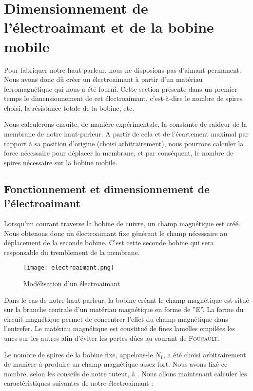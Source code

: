

\section{Dimensionnement de l'électroaimant et de la bobine mobile}
Pour fabriquer notre haut-parleur, nous ne disposions pas d'aimant permanent. Nous avons donc
dû créer un électroaimant à partir d'un matériau ferromagnétique qui nous a été fourni.
Cette section présente dans un premier temps le dimensionnement de cet électroaimant, c'est-à-dire le
nombre de spires choisi, la résistance totale de la bobine, etc.

Nous calculerons ensuite, de manière expérimentale, la constante de raideur de la membrane de
notre haut-parleur. A partir de cela et de l'écartement maximal par rapport à sa position d'origine 
(choisi arbitrairement), 
nous pourrons calculer la force nécessaire pour déplacer la membrane, et par conséquent, le nombre
de spires nécessaire sur la bobine mobile.

\subsection{Fonctionnement et dimensionnement de l'électroaimant}
Lorsqu'un courant traverse la bobine de cuivre, un champ magnétique est créé.  Nous obtenons 
donc un électroaimant fixe générant le champ nécessaire au déplacement de la seconde bobine. 
C'est cette seconde bobine qui sera responsable du tremblement de la membrane.

\begin{figure}[ht!]
\centering
\texttt{[image: electroaimant.png]}
\caption{Modélisation d'un électroaimant}
\label{modélisation de l'électroaimant}
\end{figure}

Dans le cas de notre haut-parleur, la bobine créant le champ magnétique est situé sur 
la branche centrale d'un matériau magnétique en forme de ''E''. La forme du circuit 
magnétique permet de concentrer l'effet du champ magnétique dans l'entrefer. Le matériau
magnétique est constitué de fines lamelles empilées les unes sur les autres afin
d'éviter les pertes dûes au courant de \textsc{Foucault}.

Le nombre de spires de la bobine fixe, appelons-le $N_1$, a été choisi arbitrairement de manière à produire un
champ magnétique assez fort. Nous avons fixé ce nombre, selon les conseils de notre tuteur, à . 
Nous allons maintenant calculer les caractéristiques suivantes de notre électroaimant :

